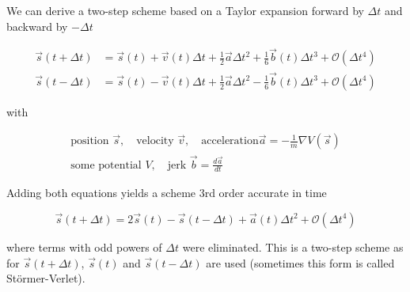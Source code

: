 
We can derive a two-step scheme based on a Taylor expansion forward by $\Delta t$ and backward by $-\Delta t$

\begin{equation}
  \label{eq:stormer}
  \begin{aligned}
    \vec{s}(t+\Delta t) &= \vec{s}(t) + \vec{v}(t)\Delta t + \frac{1}{2} \vec{a} \Delta t^2 + \frac{1}{6} \vec{b}(t) \Delta t^3 + \mathcal{O}(\Delta t^4) \\
    \vec{s}(t-\Delta t) &= \vec{s}(t) - \vec{v}(t)\Delta t + \frac{1}{2} \vec{a} \Delta t^2 - \frac{1}{6} \vec{b}(t) \Delta t^3 + \mathcal{O}(\Delta t^4)
  \end{aligned}
\end{equation}

with

\begin{equation}
  \begin{gathered}
    \text{position } \vec{s}, \quad \text{velocity } \vec{v}, \quad \text{acceleration} \vec{a} = - \frac{1}{m} \nabla V(\vec{s}) \\
    \text{some potential } V, \quad \text{jerk } \vec{b} = \frac{d\vec{a}}{dt}
  \end{gathered}
\end{equation}

Adding both equations yields a scheme 3rd order accurate in time

\begin{equation}
  \vec{s}(t+\Delta t) = 2 \vec{s}(t) - \vec{s}(t-\Delta t) + \vec{a}(t) \Delta t^2 + \mathcal{O}(\Delta t^4)
\end{equation}

where terms with odd powers of $\Delta t$ were eliminated. This is a two-step scheme as for $\vec{s}(t+\Delta t)$, $\vec{s}(t)$ and $\vec{s}(t-\Delta t)$
are used (sometimes this form is called Störmer-Verlet).


